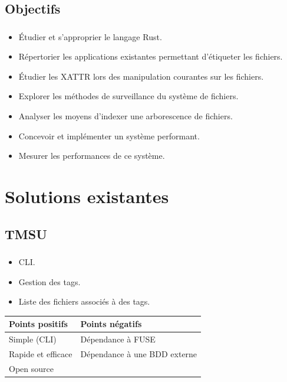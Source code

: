 \documentclass[10pt]{beamer}
\begin{document}
\subsection{Objectifs}
\begin{frame}
    \frametitle{\subsecname}
    \begin{itemize}
        \item Étudier et s'approprier le langage Rust.
        \pause
        \item Répertorier les applications existantes permettant d'étiqueter les fichiers.
        \pause
        \item Étudier les XATTR lors des manipulation courantes sur les fichiers.
        \pause
        \item Explorer les méthodes de surveillance du système de fichiers.
        \pause
        \item Analyser les moyens d'indexer une arborescence de fichiers.
        \pause
        \item Concevoir et implémenter un système performant.
        \pause
        \item Mesurer les performances de ce système.
    \end{itemize}
\end{frame}

\section{Solutions existantes}
\subsection{TMSU}
\begin{frame}
    \frametitle{\subsecname}
    \begin{itemize}
        \item CLI.
        \item Gestion des tags.
        \item Liste des fichiers associés à des tags.
    \end{itemize}
    \pause
    \begin{center}
        \begin{tabularx}{8cm}{|X|X|} \hline
            \textbf{Points positifs} & \textbf{Points négatifs} \\ \hline
            Simple (CLI) & Dépendance à FUSE \\ \hline
            Rapide et efficace & Dépendance à une BDD externe \\ \hline
            Open source &  \\ \hline
        \end{tabularx}
    \end{center}
\end{frame}
\end{document}
